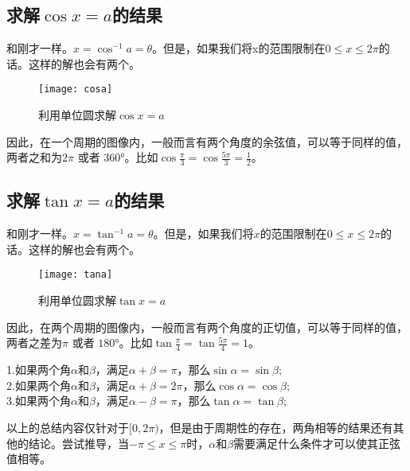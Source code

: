 \subsection*{求解$\cos x=a$的结果}
和刚才一样。$x=\cos^{-1} a=\theta$。但是，如果我们将x的范围限制在$0\le x\le 2\pi$的话。这样的解也会有两个。
\begin{figure}[H]
\centering
\texttt{[image: cosa]}
\caption{利用单位圆求解$\cos x=a$}
\end{figure}
因此，在一个周期的图像内，一般而言有两个角度的余弦值，可以等于同样的值，两者之和为$2\pi$ 或者 $360$\si{\degree}。比如$\cos \frac{\pi}{3}=\cos \frac{5\pi}{3}=\frac{1}{2}$。


\subsection*{求解$\tan x=a$的结果}
和刚才一样。$x=\tan^{-1} a=\theta$。但是，如果我们将$x$的范围限制在$0\le x\le 2\pi$的话。这样的解也会有两个。

\begin{figure}[H]
\centering
\texttt{[image: tana]}
\caption{利用单位圆求解$\tan x=a$}
\end{figure}
因此，在两个周期的图像内，一般而言有两个角度的正切值，可以等于同样的值，两者之差为$\pi$ 或者 $180$\si{\degree}。比如$\tan \frac{\pi}{4}=\tan \frac{5\pi}{4}=1$。

\begin{SummBox}
1.如果两个角$\alpha$和$\beta$，满足$\alpha+\beta=\pi$，那么$\sin \alpha=\sin \beta$;\\
2.如果两个角$\alpha$和$\beta$，满足$\alpha+\beta=2\pi$，那么$\cos \alpha=\cos \beta$;\\
3.如果两个角$\alpha$和$\beta$，满足$\alpha-\beta=\pi$，那么$\tan \alpha=\tan \beta$;
\end{SummBox}

\begin{TaskBox}
以上的总结内容仅针对于$[0,2\pi)$，但是由于周期性的存在，两角相等的结果还有其他的结论。尝试推导，当$-\pi\le x\le \pi$时，$\alpha$和$\beta$需要满足什么条件才可以使其正弦值相等。
\end{TaskBox}

\clearpage

